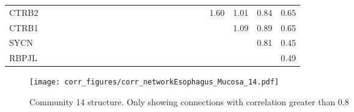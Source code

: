 \begin{longtable}{lrrrrrrrrrrrrrrrrrrrrrrr}
CTRB2    &              &              &              &              &             &             &             &             &            &              &            &            &            &             &             &                &               &           &             &        1.60 &       1.01 &        0.84 &        0.65 \\
CTRB1    &              &              &              &              &             &             &             &             &            &              &            &            &            &             &             &                &               &           &             &             &       1.09 &        0.89 &        0.65 \\
SYCN     &              &              &              &              &             &             &             &             &            &              &            &            &            &             &             &                &               &           &             &             &            &        0.81 &        0.45 \\
RBPJL    &              &              &              &              &             &             &             &             &            &              &            &            &            &             &             &                &               &           &             &             &            &             &        0.49 \\
\end{longtable}


\begin{figure}[h!]
\centering
\texttt{[image: corr\_figures/corr\_networkEsophagus\_Mucosa\_14.pdf]}
\caption{Community 14 structure. Only showing connections with correlation greater than 0.8}
\end{figure}




